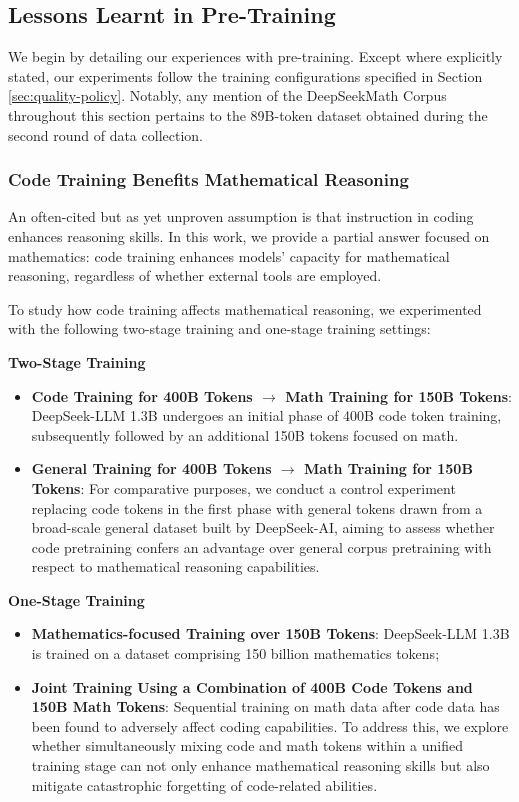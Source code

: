 \begin{itemize}[topsep=0pt]
\subsection{Lessons Learnt in Pre-Training}

We begin by detailing our experiences with pre-training. Except where explicitly stated, our experiments follow the training configurations specified in Section \ref{sec:quality-policy}. Notably, any mention of the DeepSeekMath Corpus throughout this section pertains to the 89B-token dataset obtained during the second round of data collection.

\subsubsection{Code Training Benefits Mathematical Reasoning}

An often-cited but as yet unproven assumption is that instruction in coding enhances reasoning skills. In this work, we provide a partial answer focused on mathematics: code training enhances models’ capacity for mathematical reasoning, regardless of whether external tools are employed.

To study how code training affects mathematical reasoning, we experimented with the following two-stage training and one-stage training settings:

\textbf{Two-Stage Training}

\begin{itemize}[topsep=0pt]
    \item \textbf{Code Training for 400B Tokens $\rightarrow$ Math Training for 150B Tokens}: DeepSeek-LLM 1.3B undergoes an initial phase of 400B code token training, subsequently followed by an additional 150B tokens focused on math.
    \item \textbf{General Training for 400B Tokens $\rightarrow$ Math Training for 150B Tokens}: For comparative purposes, we conduct a control experiment replacing code tokens in the first phase with general tokens drawn from a broad-scale general dataset built by DeepSeek-AI, aiming to assess whether code pretraining confers an advantage over general corpus pretraining with respect to mathematical reasoning capabilities.
\end{itemize}

\textbf{One-Stage Training}

\begin{itemize}[topsep=0pt]
    \item \textbf{Mathematics-focused Training over 150B Tokens}: DeepSeek-LLM 1.3B is trained on a dataset comprising 150 billion mathematics tokens;
    \item \textbf{Joint Training Using a Combination of 400B Code Tokens and 150B Math Tokens}: Sequential training on math data after code data has been found to adversely affect coding capabilities. To address this, we explore whether simultaneously mixing code and math tokens within a unified training stage can not only enhance mathematical reasoning skills but also mitigate catastrophic forgetting of code-related abilities.
\end{itemize}


\end{itemize}
